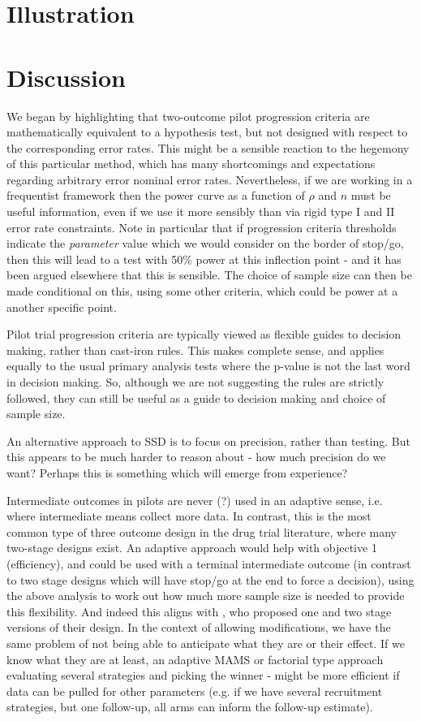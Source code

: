 \documentclass[sagev]{sagej} %
\begin{document}
\section{Illustration}\label{sec:illustrate}

\section{Discussion}\label{sec:discussion}

We began by highlighting that two-outcome pilot progression criteria are mathematically equivalent to a hypothesis test, but not designed with respect to the corresponding error rates. This might be a sensible reaction to the hegemony of this particular method, which has many shortcomings and expectations regarding arbitrary error nominal error rates. Nevertheless, if we are working in a frequentist framework then the power curve as a function of $\rho$ and $n$ must be useful information, even if we use it more sensibly than via rigid type I and II error rate constraints. Note in particular that if progression criteria thresholds indicate the \emph{parameter} value which we would consider on the border of stop/go, then this will lead to a test with 50\% power at this inflection point - and it has been argued elsewhere that this is sensible. The choice of sample size can then be made conditional on this, using some other criteria, which could be power at a another specific point.

Pilot trial progression criteria are typically viewed as flexible guides to decision making, rather than cast-iron rules. This makes complete sense, and applies equally to the usual primary analysis tests where the p-value is not the last word in decision making. So, although we are not suggesting the rules are strictly followed, they can still be useful as a guide to decision making and choice of sample size.

An alternative approach to SSD is to focus on precision, rather than testing. But this appears to be much harder to reason about - how much precision do we want? Perhaps this is something which will emerge from experience?

Intermediate outcomes in pilots are never (?) used in an adaptive sense, i.e. where intermediate means collect more data. In contrast, this is the most common type of three outcome design in the drug trial literature, where many two-stage designs exist. An adaptive approach would help with objective 1 (efficiency), and could be used with a terminal intermediate outcome (in contrast to two stage designs which will have stop/go at the end to force a decision), using the above analysis to work out how much more sample size is needed to provide this flexibility. And indeed this aligns with \cite{Sargent2001}, who proposed one and two stage versions of their design. In the context of allowing modifications, we have the same problem of not being able to anticipate what they are or their effect. If we know what they are at least, an adaptive MAMS or factorial type approach evaluating several strategies and picking the winner - might be more efficient if data can be pulled for other parameters (e.g. if we have several recruitment strategies, but one follow-up, all arms can inform the follow-up estimate).
\end{document}
